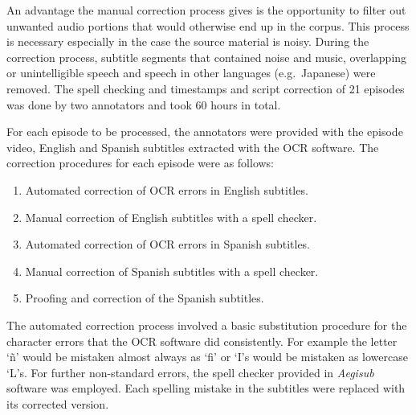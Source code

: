 An advantage the manual correction process gives is the opportunity to filter out unwanted audio portions that would otherwise end up in the corpus. This process is necessary especially in the case the source material is noisy. During the correction process, subtitle segments that contained noise and music, overlapping or unintelligible speech and speech in other languages (e.g.~Japanese) were removed. The spell checking and timestamps and script correction of 21 episodes was done by two annotators and took 60 hours in total. 

For each episode to be processed, the annotators were provided with the episode video, English and Spanish subtitles extracted with the OCR software. The correction procedures for each episode were as follows:
\begin{enumerate}
    \item Automated correction of OCR errors in English subtitles.
    \item Manual correction of English subtitles with a spell checker.
    \item Automated correction of OCR errors in Spanish subtitles.
    \item Manual correction of Spanish subtitles with a spell checker.
    \item Proofing and correction of the Spanish subtitles.
\end{enumerate}

The automated correction process involved a basic substitution procedure for the character errors that the OCR software did consistently. For example the letter `ñ' would be mistaken almost always as `fi' or `I's would be mistaken as lowercase `L's. For further non-standard errors, the spell checker provided in \textit{Aegisub} software was employed. Each spelling mistake in the subtitles were replaced with its corrected version.

